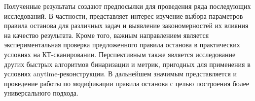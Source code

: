 Полученные результаты создают предпосылки для проведения ряда последующих исследований. В частности, представляет интерес изучение выбора параметров правила останова для различных задач и выявление закономерностей их влияния на качество результата. Кроме того, важным направлением является экспериментальная проверка предложенного правила останова в практических условиях на КТ-сканировании. Перспективным также является исследование других быстрых алгоритмов бинаризации и метрик, пригодных для применения в условиях anytime-реконструкции. В дальнейшем значимым представляется и проведение работы по модификации правила останова с целью построения более универсального подхода.
